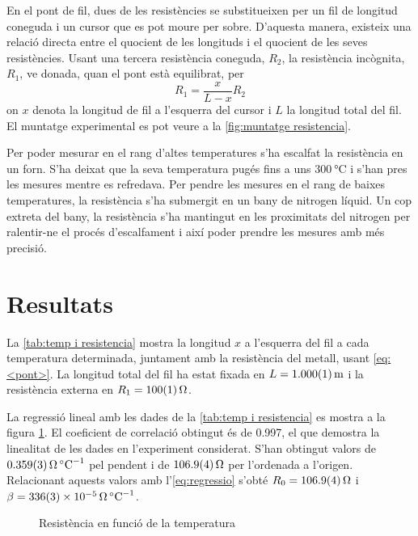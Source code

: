 En el pont de fil, dues de les resistències se substitueixen per un fil de longitud coneguda i un cursor que es pot moure per sobre. D'aquesta manera, existeix una relació directa entre el quocient de les longituds i el quocient de les seves resistències. Usant una tercera resistència coneguda, $R_2$, la resistència incògnita, $R_1$, ve donada, quan el pont està equilibrat, per
\begin{equation}\label{eq: <pont>}
R_1=\frac{x}{L-x}R_2
\end{equation}
on $x$ denota la longitud de fil a l'esquerra del cursor i $L$ la longitud total del fil. El muntatge experimental es pot veure a la \cref{fig:muntatge resistencia}. 

Per poder mesurar en el rang d'altes temperatures s'ha escalfat la resistència en un forn. S'ha deixat que la seva temperatura pugés fins a uns $\SI{300}{\celsius}$ i s'han pres les mesures mentre es refredava. Per pendre les mesures en el rang de baixes temperatures, la resistència s'ha submergit en un bany de nitrogen líquid. Un cop extreta del bany, la resistència s'ha mantingut en les proximitats del nitrogen per ralentir-ne el procés d'escalfament i així poder prendre les mesures amb més precisió. 

\section{Resultats}
La \cref{tab:temp i resistencia} mostra la longitud $x$ a l'esquerra del fil a cada temperatura determinada, juntament amb la resistència del metall, usant \ref{eq: <pont>}. La longitud total del fil ha estat fixada en $L=\data{1.000}{0.001}{\meter}$ i la resistència externa en $R_1=\data{100}{1}{\ohm}$.

La regressió lineal amb les dades de la \cref{tab:temp i resistencia} es mostra a la figura \ref{fig:temp v resistencia}. El coeficient de correlació obtingut és de 0.997, el que demostra la linealitat de les dades en l'experiment considerat. S'han obtingut valors de $\data{0.359}{0.003}{\ohm\per\celsius}$ pel pendent i de $\data{106.9}{0.4}{\ohm}$ per l'ordenada a l'origen. Relacionant aquests valors amb l'\cref{eq:regressio} s'obté $R_0=\data{106.9}{0.4}{\ohm}$ i $\beta=\data{336}{3e-5}{\ohm\per\celsius}$.

\begin{figure} [htb]
	\centering
	\small \sffamily
	\caption{Resistència en funció de la temperatura}
	\label{fig:temp v resistencia}
\end{figure}

